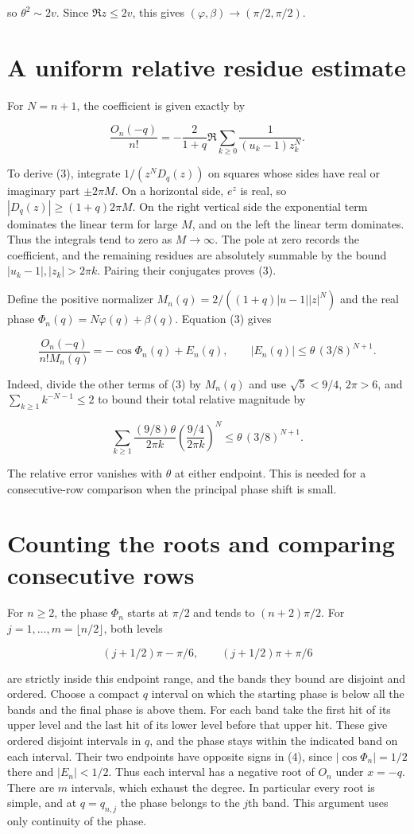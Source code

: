\documentclass[11pt]{article}
\begin{document}
so $\theta^2\sim2v$. Since $\Re z\le2v$, this gives $(\varphi,\beta)\to(\pi/2,\pi/2)$.

\section{A uniform relative residue estimate}

For $N=n+1$, the coefficient is given exactly by

\[
\frac{O_n(-q)}{n!}=-\frac2{1+q}\Re\sum_{k\ge0}\frac1{(u_k-1)z_k^{N}}.
\tag{3}
\]

To derive (3), integrate $1/(z^N D_q(z))$ on squares whose sides have real or imaginary part $\pm 2\pi M$. On a horizontal side, $e^z$ is real, so $|D_q(z)|\ge(1+q)2\pi M$. On the right vertical side the exponential term dominates the linear term for large $M$, and on the left the linear term dominates. Thus the integrals tend to zero as $M\to\infty$. The pole at zero records the coefficient, and the remaining residues are absolutely summable by the bound $|u_k-1|,|z_k|>2\pi k$. Pairing their conjugates proves (3).

Define the positive normalizer $M_n(q)=2/((1+q)|u-1||z|^N)$ and the real phase $\Phi_n(q)=N\varphi(q)+\beta(q)$. Equation (3) gives

\[
\frac{O_n(-q)}{n!M_n(q)}=-\cos\Phi_n(q)+E_n(q),
\qquad |E_n(q)|\le\theta\,(3/8)^{N+1}.
\tag{4}
\]

Indeed, divide the other terms of (3) by $M_n(q)$ and use $\sqrt5<9/4$, $2\pi>6$, and $\sum_{k\ge1} k^{-N-1}\le2$ to bound their total relative magnitude by

\[
\sum_{k\ge1}\frac{(9/8)\theta}{2\pi k}
 \left(\frac{9/4}{2\pi k}\right)^N
\le\theta\,(3/8)^{N+1}.
\]

The relative error vanishes with $\theta$ at either endpoint. This is needed for a consecutive-row comparison when the principal phase shift is small.

\section{Counting the roots and comparing consecutive rows}

For $n\ge2$, the phase $\Phi_n$ starts at $\pi/2$ and tends to $(n+2)\pi/2$. For $j=1,\ldots,m=\lfloor n/2\rfloor$, both levels

\[
(j+1/2)\pi-\pi/6,\qquad (j+1/2)\pi+\pi/6
\]

are strictly inside this endpoint range, and the bands they bound are disjoint and ordered. Choose a compact $q$ interval on which the starting phase is below all the bands and the final phase is above them. For each band take the first hit of its upper level and the last hit of its lower level before that upper hit. These give ordered disjoint intervals in $q$, and the phase stays within the indicated band on each interval. Their two endpoints have opposite signs in (4), since $|\cos\Phi_n|=1/2$ there and $|E_n|<1/2$. Thus each interval has a negative root of $O_n$ under $x=-q$. There are $m$ intervals, which exhaust the degree. In particular every root is simple, and at $q=q_{n,j}$ the phase belongs to the $j$th band. This argument uses only continuity of the phase.
\end{document}
